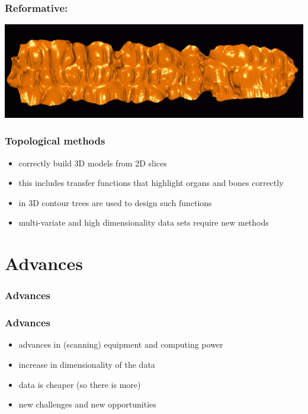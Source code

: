 \documentclass{beamer}
\begin{document}
\begin{frame}
	\frametitle{Reformative:} %
	\includegraphics[width=\textwidth]{images/colon}
\end{frame}

\begin{frame}
	\frametitle{Topological methods}
	\begin{itemize}
		\item correctly build 3D models from 2D slices
		\item this includes transfer functions that highlight organs and bones
correctly
		\item in 3D contour trees are used to design such functions
		\item multi-variate and high dimensionality data sets require new
methods
	\end{itemize}
\end{frame}


\section{Advances}

\begin{frame}
	\frametitle{Advances}
\end{frame}

\begin{frame}
	\frametitle{Advances}
		\begin{itemize}
			\item advances in (scanning) equipment and computing power
			\item increase in dimensionality of the data
			\item data is cheaper (so there is more)
			\item new challenges and new opportunities
		\end{itemize}
\end{frame}
\end{document}
